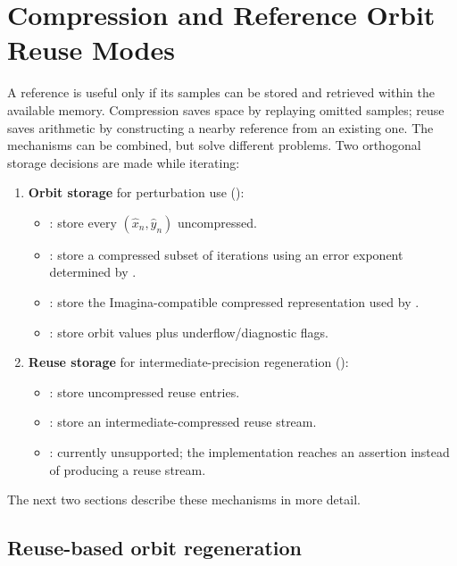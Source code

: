 \section{Compression and Reference Orbit Reuse Modes}
\label{subsec:ref-orbit-compression-reuse}

A reference is useful only if its samples can be stored and retrieved within
the available memory.  Compression saves space by replaying omitted samples;
reuse saves arithmetic by constructing a nearby reference from an existing
one.  The mechanisms can be combined, but solve different problems.  Two
orthogonal storage decisions are made while iterating:

\begin{enumerate}
  \item \textbf{Orbit storage} for perturbation use ():
  \begin{itemize}
    \item {}: store every \((\hat{x}_n,\hat{y}_n)\) uncompressed.
    \item {}: store a compressed subset of iterations using an error exponent
          determined by .
    \item {}: store the Imagina-compatible compressed
          representation used by .
    \item {}: store orbit values plus underflow/diagnostic flags.
  \end{itemize}
  \item \textbf{Reuse storage} for intermediate-precision regeneration ():
  \begin{itemize}
    \item {}: store uncompressed  reuse entries.
    \item {}: store an intermediate-compressed reuse stream.
    \item {}: currently unsupported; the implementation
          reaches an assertion instead of producing a reuse stream.
  \end{itemize}
\end{enumerate}

The next two sections describe these mechanisms in more detail.

\subsection{Reuse-based orbit regeneration}
\label{subsec:ref-orbit-reuse}

